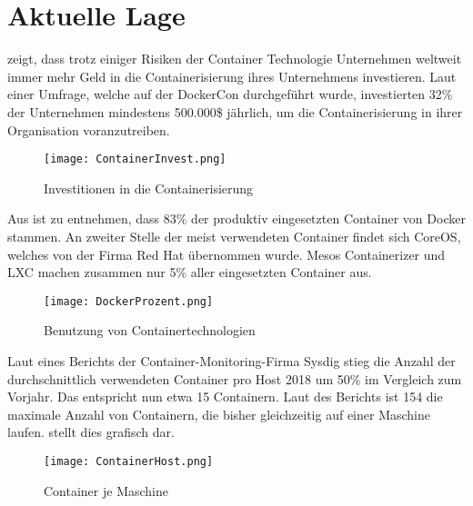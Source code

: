 \newpage
\section{Aktuelle Lage}
\label{sec:AktuelleLage}
 zeigt, dass trotz einiger Risiken der Container Technologie Unternehmen weltweit immer mehr Geld in die Containerisierung ihres Unternehmens investieren. Laut einer Umfrage, welche auf der DockerCon durchgeführt wurde, investierten 32\% der Unternehmen mindestens 500.000\$ jährlich, um die Containerisierung in ihrer Organisation voranzutreiben. \cite{Investments}
\begin{figure}[H]
	\begin{center}
		\texttt{[image: ContainerInvest.png]}
	\end{center}
	\caption[Investitionen in die Containerisierung]{Investitionen in die Containerisierung \footnotemark}
	\label{fig:Stats1}
\end{figure}
\newpage
Aus  ist zu entnehmen, dass 83\% der produktiv eingesetzten Container von Docker stammen. An zweiter Stelle der meist verwendeten Container findet sich CoreOS, welches von der Firma Red Hat übernommen wurde. Mesos Containerizer und \ac{LXC} machen zusammen nur 5\% aller eingesetzten Container aus. \cite{stats}
\begin{figure}[H]
	\begin{center}
		\texttt{[image: DockerProzent.png]}
	\end{center}
	\caption[Benutzung von Containertechnologien]{Benutzung von Containertechnologien \footnotemark}
	\label{fig:Stats2}
\end{figure}
Laut eines Berichts der Container-Monitoring-Firma Sysdig stieg die Anzahl der durchschnittlich verwendeten Container pro Host 2018 um 50\% im Vergleich zum Vorjahr. Das entspricht nun etwa 15 Containern. Laut des Berichts ist 154 die maximale Anzahl von Containern, die bisher gleichzeitig auf einer Maschine laufen.\cite{stats}\newline {} stellt dies grafisch dar.
\begin{figure}[H]
	\begin{center}
		\texttt{[image: ContainerHost.png]}
	\end{center}
	\caption[Container je Maschine]{Container je Maschine \footnotemark}
	\label{fig:Stats3}
\end{figure}
